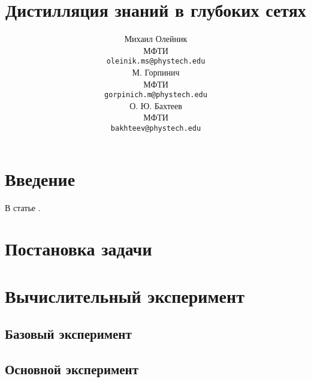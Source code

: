 \documentclass{article}
\title{Дистилляция знаний в глубоких сетях}
\author{ Михаил Олейник \\ 
  МФТИ \\
  \texttt{oleinik.ms@phystech.edu} \\
  \And
  М. Горпинич \\ 
  МФТИ \\
  \texttt{gorpinich.m@phystech.edu} \\
  \And
  О. Ю. Бахтеев \\ 
  МФТИ \\ 
  \texttt{bakhteev@phystech.edu} \\
}
\date{}
\begin{document}
\maketitle

\begin{abstract}


\end{abstract}



\section{Введение}

В статье \cite{hinton2015distilling}.

\section{Постановка задачи}

\section{Вычислительный эксперимент}

\subsection{Базовый эксперимент}


\subsection{Основной эксперимент}




\newpage


\end{document}

